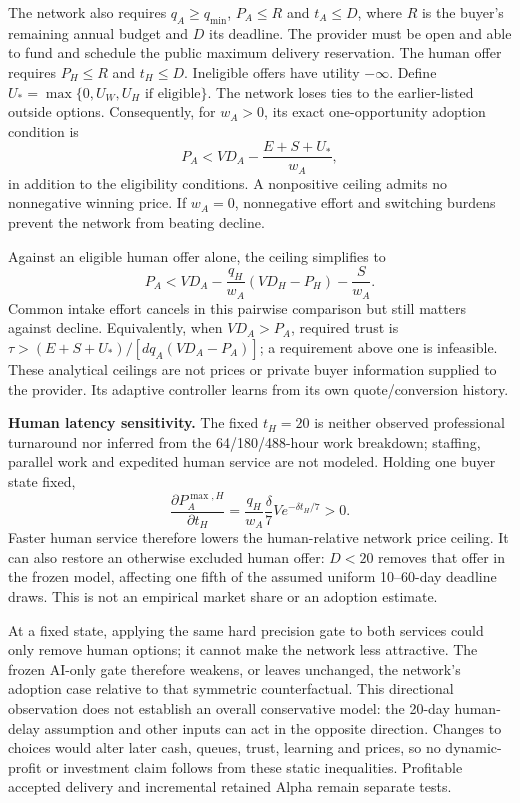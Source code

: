 The network also requires $q_A\ge q_{\min}$, $P_A\le R$ and $t_A\le D$, where $R$
is the buyer's remaining annual budget and $D$ its deadline. The provider must be
open and able to fund and schedule the public maximum delivery reservation. The
human offer requires $P_H\le R$ and $t_H\le D$. Ineligible offers have utility
$-\infty$. Define $U_* = \max\{0,U_W,U_H\text{ if eligible}\}$. The network loses
ties to the earlier-listed outside options. Consequently, for $w_A>0$, its exact
one-opportunity adoption condition is
\begin{equation}
 \boxed{P_A < VD_A-\frac{E+S+U_*}{w_A}},
 \label{eq:buyer-complete-ceiling}
\end{equation}
in addition to the eligibility conditions. A nonpositive ceiling admits no
nonnegative winning price. If $w_A=0$, nonnegative effort and switching burdens
prevent the network from beating decline.

Against an eligible human offer alone, the ceiling simplifies to
\begin{equation}
 P_A < VD_A-\frac{q_H}{w_A}(VD_H-P_H)-\frac{S}{w_A}.
 \label{eq:buyer-human-ceiling}
\end{equation}
Common intake effort cancels in this pairwise comparison but still matters
against decline. Equivalently, when $VD_A>P_A$, required trust is
$\tau>(E+S+U_*)/[d q_A(VD_A-P_A)]$; a requirement above one is infeasible. These
analytical ceilings are not prices or private buyer information supplied to the
provider. Its adaptive controller learns from its own quote/conversion history.

\textbf{Human latency sensitivity.}
The fixed $t_H=20$ is neither observed professional turnaround nor inferred from
the 64/180/488-hour work breakdown; staffing, parallel work and expedited human
service are not modeled. Holding one buyer state fixed,
\begin{equation}
 \frac{\partial P_A^{\max,H}}{\partial t_H}
 =\frac{q_H}{w_A}\frac{\delta}{7}V e^{-\delta t_H/7}>0.
\end{equation}
Faster human service therefore lowers the human-relative network price ceiling.
It can also restore an otherwise excluded human offer: $D<20$ removes that offer
in the frozen model, affecting one fifth of the assumed uniform 10--60-day
deadline draws. This is not an empirical market share or an adoption estimate.

At a fixed state, applying the same hard precision gate to both services could
only remove human options; it cannot make the network less attractive. The frozen
AI-only gate therefore weakens, or leaves unchanged, the network's adoption case
relative to that symmetric counterfactual. This directional observation does not
establish an overall conservative model: the 20-day human-delay assumption and
other inputs can act in the opposite direction. Changes to choices would alter
later cash, queues, trust, learning and prices, so no dynamic-profit or investment
claim follows from these static inequalities. Profitable accepted delivery and
incremental retained Alpha remain separate tests.

